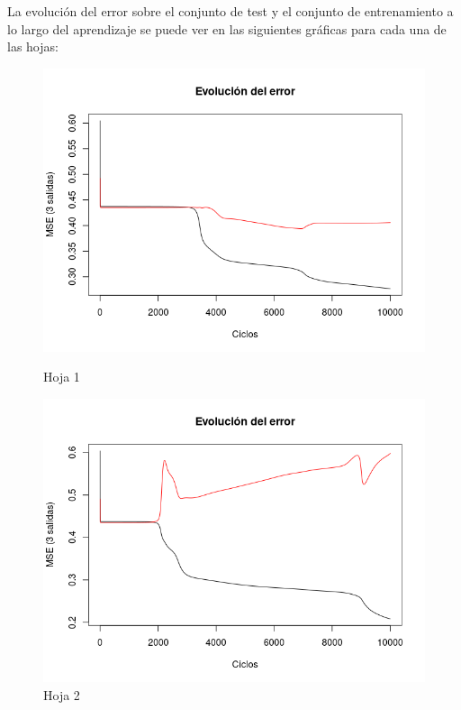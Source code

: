 \documentclass{uc3mpracticas}
\begin{document}
La evolución del error sobre el conjunto de test y el conjunto de entrenamiento a lo largo del aprendizaje se puede ver en las siguientes gráficas para cada una de las hojas:

\begin{figure}[!h]
\centering
\begin{minipage}{.52\textwidth}
  \centering
  \includegraphics[width=.9\linewidth]{Images/best_fold1.png}
  \caption*{Hoja 1}
\end{minipage}%
\begin{minipage}{.52\textwidth}
  \centering
  \includegraphics[width=.9\linewidth]{Images/best_fold2.png}
  \caption*{Hoja 2}
\end{minipage}
\end{figure}
\end{document}
